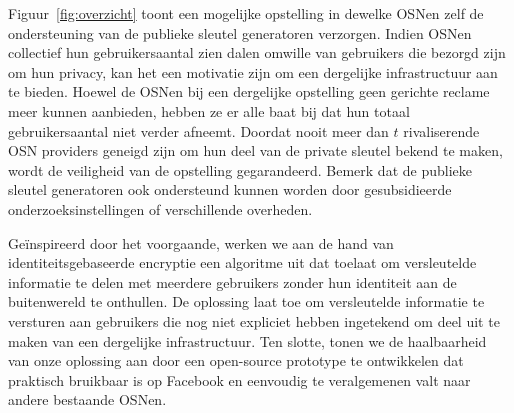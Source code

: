 Figuur~\ref{fig:overzicht} toont een mogelijke opstelling in dewelke OSNen zelf de ondersteuning van de publieke sleutel generatoren verzorgen. Indien OSNen collectief hun gebruikersaantal zien dalen omwille van gebruikers die bezorgd zijn om hun privacy, kan het een motivatie zijn om een dergelijke infrastructuur aan te bieden. Hoewel de OSNen bij een dergelijke opstelling geen gerichte reclame meer kunnen aanbieden, hebben ze er alle baat bij dat hun totaal gebruikersaantal niet verder afneemt. Doordat nooit meer dan $t$ rivaliserende OSN providers geneigd zijn om hun deel van de private sleutel bekend te maken, wordt de veiligheid van de opstelling gegarandeerd. Bemerk dat de publieke sleutel generatoren ook ondersteund kunnen worden door gesubsidieerde onderzoeksinstellingen of verschillende overheden.

Ge{\"i}nspireerd door het voorgaande, werken we aan de hand van identiteitsgebaseerde encryptie een algoritme uit dat toelaat om versleutelde informatie te delen met meerdere gebruikers zonder hun identiteit aan de buitenwereld te onthullen. De oplossing laat toe om versleutelde informatie te versturen aan gebruikers die nog niet expliciet hebben ingetekend om deel uit te maken van een dergelijke infrastructuur. Ten slotte, tonen we de haalbaarheid van onze oplossing aan door een open-source prototype te ontwikkelen dat praktisch bruikbaar is op Facebook en eenvoudig te veralgemenen valt naar andere bestaande OSNen.



